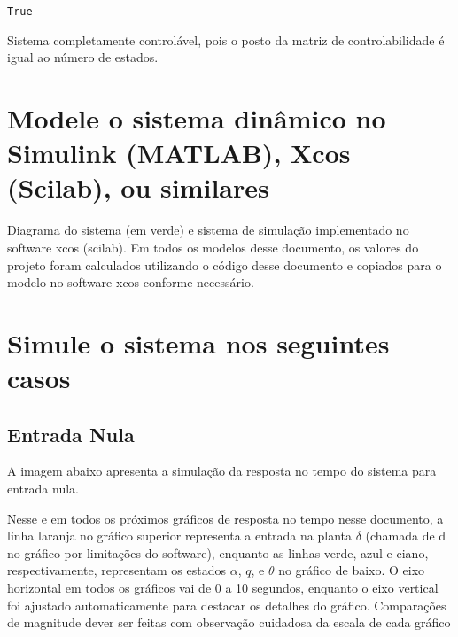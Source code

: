 \documentclass[13pt]{article}
\begin{document}
\begin{Verbatim}[commandchars=\\\{\}]
True
\end{Verbatim}

Sistema completamente controlável, pois o posto da matriz de
controlabilidade é igual ao número de estados.

    \section{Modele o sistema dinâmico no Simulink (MATLAB), Xcos (Scilab),
      ou
      similares}

Diagrama do sistema (em verde) e sistema de simulação implementado no
software xcos (scilab). Em todos os modelos desse documento, os valores
do projeto foram calculados utilizando o código desse documento e
copiados para o modelo no software xcos conforme necessário.

\begin{figure}[H]
    \centering


    
\end{figure}

    \section{Simule o sistema nos seguintes
      casos}

    \subsection{Entrada Nula}

A imagem abaixo apresenta a simulação da resposta no tempo do sistema
para entrada nula.

Nesse e em todos os próximos gráficos de resposta no tempo nesse
documento, a linha laranja no gráfico superior representa a entrada na
planta \(\delta\) (chamada de d no gráfico por limitações do software),
enquanto as linhas verde, azul e ciano, respectivamente, representam os
estados \(\alpha\), \(q\), e \(\theta\) no gráfico de baixo. O eixo
horizontal em todos os gráficos vai de 0 a 10 segundos, enquanto o eixo
vertical foi ajustado automaticamente para destacar os detalhes do
gráfico. Comparações de magnitude dever ser feitas com observação
cuidadosa da escala de cada gráfico

\begin{figure}[H]
    \centering


    
\end{figure}
\end{document}
